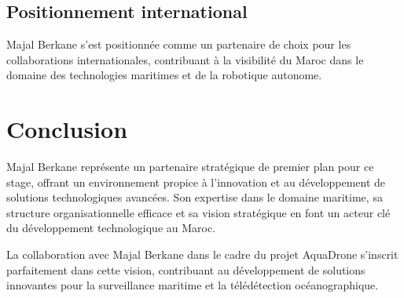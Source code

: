 {\subsection{Positionnement international}
Majal Berkane s'est positionnée comme un partenaire de choix pour les collaborations internationales, contribuant à la visibilité du Maroc dans le domaine des technologies maritimes et de la robotique autonome.

\section{Conclusion}
Majal Berkane représente un partenaire stratégique de premier plan pour ce stage, offrant un environnement propice à l'innovation et au développement de solutions technologiques avancées. Son expertise dans le domaine maritime, sa structure organisationnelle efficace et sa vision stratégique en font un acteur clé du développement technologique au Maroc.

La collaboration avec Majal Berkane dans le cadre du projet AquaDrone s'inscrit parfaitement dans cette vision, contribuant au développement de solutions innovantes pour la surveillance maritime et la télédétection océanographique.

} 